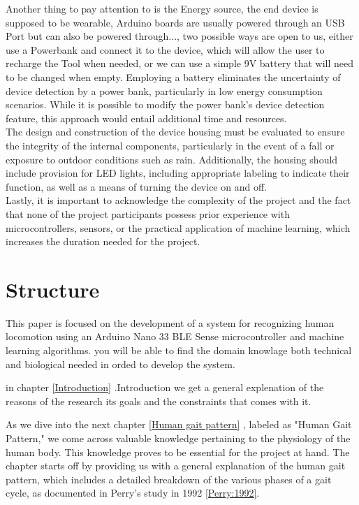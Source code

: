 Another thing to pay attention to is the Energy source, the end device is supposed to be wearable, Arduino boards are usually powered through an USB Port but can also be powered through..., 
two possible ways are open to us, either use a Powerbank and connect it to the device, which will allow the user to recharge the Tool when needed, or we can use a simple 9V battery that will need to be changed when empty. 
Employing a battery eliminates the uncertainty of device detection by a power bank, particularly in low energy consumption scenarios. While it is possible to modify the power bank's device detection feature, this approach would entail additional time and resources.\\
The design and construction of the device housing must be evaluated to ensure the integrity of the internal components, particularly in the event of a fall or exposure to outdoor conditions such as rain. Additionally, the housing should include provision for LED lights, including appropriate labeling to indicate their function, as well as a means of turning the device on and off.\\

Lastly, it is important to acknowledge the complexity of the project and the fact that none of the project participants possess prior experience with microcontrollers, sensors, or the practical application of machine learning, which increases the duration needed for the project.

\section{Structure}

This paper is focused on the development of a system for recognizing human locomotion using an Arduino Nano 33 BLE Sense microcontroller and machine learning algorithms.
you will be able to find the domain knowlage both technical and biological needed in orded to develop the system.


in chapter \ref{Introduction} .Introduction we get a general explenation of the reasons of the research its goals and the constraints that comes with it. 

As we dive into the next chapter \ref{Human gait pattern} , labeled as "Human Gait Pattern," we come across valuable knowledge pertaining to the physiology of the human body. This knowledge proves to be essential for the project at hand. The chapter starts off by providing us with a general explanation of the human gait pattern, which includes a detailed breakdown of the various phases of a gait cycle, as documented in Perry's study in 1992 \ref{Perry:1992}.

